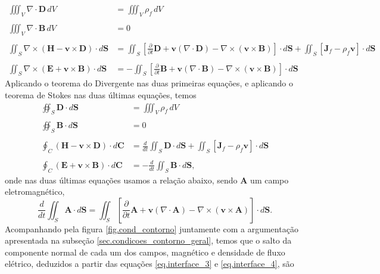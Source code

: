 \begin{align*}
\iiint_V\nabla\cdot\mathbf{D}\,dV&=\iiint_V\rho_f\,dV\\\\
\iiint_V\nabla\cdot\mathbf{B}\,dV&=0\\\\
\iint_S\nabla\times(\mathbf{H}-\mathbf{v}\times\mathbf{D})\cdot d\mathbf{S}&=\iint_S\left[\frac{\partial}{\partial t}\mathbf{D}+\mathbf{v}(\nabla\cdot\mathbf{D})-\nabla\times(\mathbf{v}\times\mathbf{B})\right]\cdot d\mathbf{S}+\iint_S\left[\mathbf{J}_f-\rho_f\mathbf{v}\right]\cdot d\mathbf{S}\\\\
\iint_S\nabla\times(\mathbf{E}+\mathbf{v}\times\mathbf{B})\cdot d\mathbf{S}&=-\iint_S\left[\frac{\partial}{\partial t}\mathbf{B}+\mathbf{v}(\nabla\cdot\mathbf{B})-\nabla\times(\mathbf{v}\times\mathbf{B})\right]\cdot d\mathbf{S}
\end{align*}
Aplicando o teorema do Divergente nas duas primeiras equa\c{c}\~oes, e aplicando o teorema de Stokes nas duas \'ultimas equa\c{c}\~oes, temos
\begin{align}\label{eq.interface_3}
\oiint_S\mathbf{D}\cdot d\mathbf{S}&=\iiint_V\rho_f\,dV\\\nonumber\\\label{eq.interface_4}
\oiint_S\mathbf{B}\cdot d\mathbf{S}&=0\\\nonumber\\\label{eq.interface_5}
\oint_C(\mathbf{H}-\mathbf{v}\times\mathbf{D})\cdot d\mathbf{C}&=\frac{d}{dt}\iint_S\mathbf{D}\cdot d\mathbf{S}+\iint_S\left[\mathbf{J}_f-\rho_f\mathbf{v}\right]\cdot d\mathbf{S}\\\nonumber\\\label{eq.interface_6}
\oint_C(\mathbf{E}+\mathbf{v}\times\mathbf{B})\cdot d\mathbf{C}&=-\frac{d}{dt}\iint_S\mathbf{B}\cdot d\mathbf{S},
\end{align} 
onde nas duas \'ultimas equa\c{c}\~oes usamos a rela\c{c}\~ao abaixo, sendo $\mathbf{A}$ um campo eletromagn\'etico,
\begin{equation*}
\frac{d}{dt}\iint_S\mathbf{A}\cdot d\mathbf{S}=\iint_S\left[\frac{\partial}{\partial t}\mathbf{A}+\mathbf{v}(\nabla\cdot\mathbf{A})-\nabla\times(\mathbf{v}\times\mathbf{A})\right]\cdot d\mathbf{S}.
\end{equation*}
Acompanhando pela figura \ref{fig.cond_contorno} juntamente com a argumenta\c{c}\~ao apresentada na subse\c{c}\~ao \ref{sec.condicoes_contorno_geral}, temos que o salto da componente normal de cada um dos campos, magn\'etico e densidade de fluxo el\'etrico, deduzidos a partir das equa\c{c}\~oes \ref{eq.interface_3} e \ref{eq.interface_4}, s\~ao
